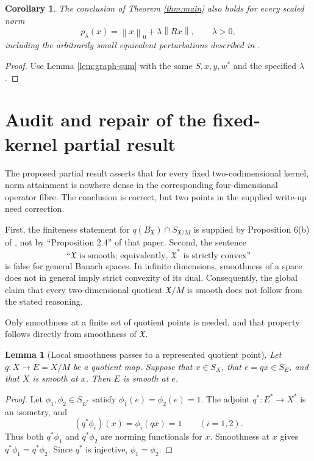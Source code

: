 \documentclass[11pt]{article}
\newtheorem{lemma}[theorem]{Lemma}
\newtheorem{corollary}[theorem]{Corollary}
\theoremstyle{definition}
\newcommand{\X}{\mathfrak X}
\newcommand{\norm}[1]{\left\lVert #1\right\rVert}
\begin{document}
\begin{corollary}\label{cor:scaled}
The conclusion of Theorem \ref{thm:main} also holds for every scaled norm
\[
              p_\lambda(x)=\norm{x}_0+\lambda\norm{Rx},
              \qquad \lambda>0,
\]
including the arbitrarily small equivalent perturbations described in
\cite[Remark 2]{Martin2025}.
\end{corollary}

\begin{proof}
Use Lemma \ref{lem:graph-sum} with the same \(S,x,y,w^*\) and the specified
\(\lambda\).
\end{proof}

\section{Audit and repair of the fixed-kernel partial result}

The proposed partial result asserts that for every fixed two-codimensional
kernel, norm attainment is nowhere dense in the corresponding four-dimensional
operator fibre.  The conclusion is correct, but two points in the supplied
write-up need correction.

First, the finiteness statement for
\(q(B_\X)\cap S_{\X/M}\) is supplied by Proposition 6(b) of
\cite{Martin2025}, not by ``Proposition 2.4'' of that paper.  Second, the
sentence
\[
       \text{``\(\X\) is smooth; equivalently, \(\X^*\) is strictly convex''}
\]
is false for general Banach spaces.  In infinite dimensions, smoothness of a
space does not in general imply strict convexity of its dual.  Consequently,
the global claim that every two-dimensional quotient \(\X/M\) is smooth does
not follow from the stated reasoning.

Only smoothness at a finite set of quotient points is needed, and that property
follows directly from smoothness of \(\X\).

\begin{lemma}[Local smoothness passes to a represented quotient point]
\label{lem:quotient-smooth-point}
Let \(q:X\to E=X/M\) be a quotient map.  Suppose that \(x\in S_X\), that
\(e=qx\in S_E\), and that \(X\) is smooth at \(x\).  Then \(E\) is smooth at
\(e\).
\end{lemma}

\begin{proof}
Let \(\phi_1,\phi_2\in S_{E^*}\) satisfy
\(\phi_1(e)=\phi_2(e)=1\).  The adjoint \(q^*:E^*\to X^*\) is an isometry, and
\[
        (q^*\phi_i)(x)=\phi_i(qx)=1\qquad(i=1,2).
\]
Thus both \(q^*\phi_1\) and \(q^*\phi_2\) are norming functionals for \(x\).
Smoothness at \(x\) gives \(q^*\phi_1=q^*\phi_2\).  Since \(q^*\) is
injective, \(\phi_1=\phi_2\).
\end{proof}
\end{document}
